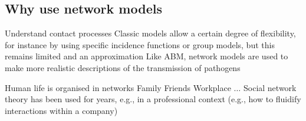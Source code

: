 \documentclass[aspectratio=43]{beamer}
\begin{document}
\subsection{Why use network models}

\begin{frame}{Understand contact processes}
Classic models allow a certain degree of flexibility, for instance by using specific incidence functions or group models, but this remains limited and an approximation
\vfill
Like ABM, network models are used to make more realistic descriptions of the transmission of pathogens
\end{frame}


\begin{frame}{Human life is organised in networks}
Family
\vfill
Friends
\vfill
Workplace
\vfill
$\ldots$
\vfill
Social network theory has been used for years, e.g., in a professional context (e.g., how to fluidify interactions within a company)
\end{frame}
\end{document}
